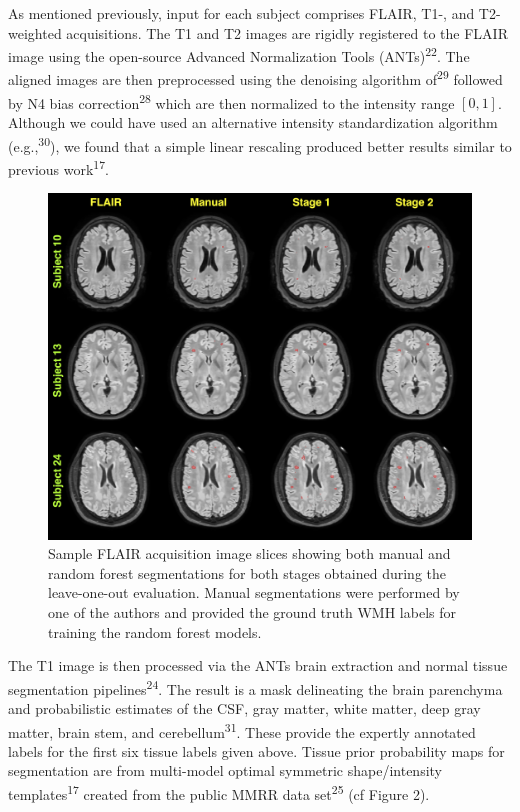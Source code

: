 \documentclass[11pt,]{article}
\begin{document}
As mentioned previously, input for each subject comprises FLAIR, T1-,
and T2-weighted acquisitions. The T1 and T2 images are rigidly
registered to the FLAIR image using the open-source Advanced
Normalization Tools (ANTs)\textsuperscript{22}. The aligned images are
then preprocessed using the denoising algorithm of\textsuperscript{29}
followed by N4 bias correction\textsuperscript{28} which are then
normalized to the intensity range \([0,1]\). Although we could have used
an alternative intensity standardization algorithm
(e.g.,\textsuperscript{30}), we found that a simple linear rescaling
produced better results similar to previous work\textsuperscript{17}.

\begin{figure}[htbp]
\centering
\includegraphics{Figures/sampleResults.png}
\caption{Sample FLAIR acquisition image slices showing both manual and
random forest segmentations for both stages obtained during the
leave-one-out evaluation. Manual segmentations were performed by one of
the authors and provided the ground truth WMH labels for training the
random forest models.}
\end{figure}

The T1 image is then processed via the ANTs brain extraction and normal
tissue segmentation pipelines\textsuperscript{24}. The result is a mask
delineating the brain parenchyma and probabilistic estimates of the CSF,
gray matter, white matter, deep gray matter, brain stem, and
cerebellum\textsuperscript{31}. These provide the expertly annotated
labels for the first six tissue labels given above. Tissue prior
probability maps for segmentation are from multi-model optimal symmetric
shape/intensity templates\textsuperscript{17} created from the public
MMRR data set\textsuperscript{25} (cf Figure 2).
\end{document}
